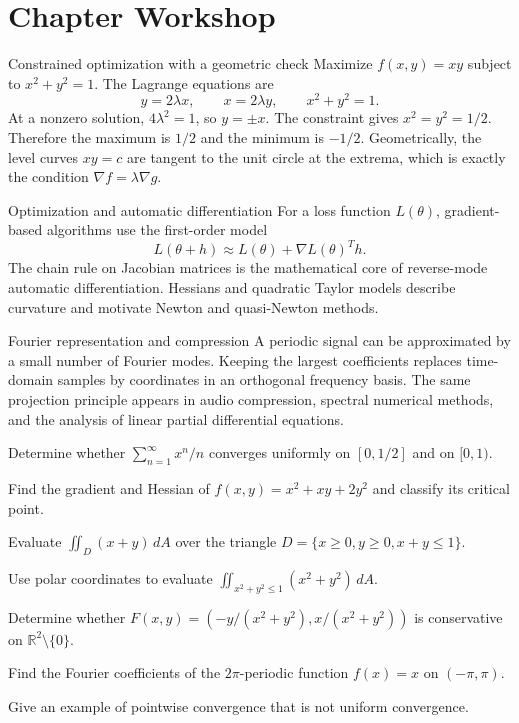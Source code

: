 \section{Chapter Workshop}

\begin{workedexample}{Constrained optimization with a geometric check}
Maximize $f(x,y)=xy$ subject to $x^2+y^2=1$. The Lagrange equations are
\[
    y=2\lambda x,
    \qquad
    x=2\lambda y,
    \qquad
    x^2+y^2=1.
\]
At a nonzero solution, $4\lambda^2=1$, so $y=\pm x$. The constraint gives $x^2=y^2=1/2$. Therefore the maximum is $1/2$ and the minimum is $-1/2$. Geometrically, the level curves $xy=c$ are tangent to the unit circle at the extrema, which is exactly the condition $\nabla f=\lambda\nabla g$.
\end{workedexample}

\begin{applicationbox}{Optimization and automatic differentiation}
For a loss function $L(\theta)$, gradient-based algorithms use the first-order model
\[
    L(\theta+h)\approx L(\theta)+\nabla L(\theta)^Th.
\]
The chain rule on Jacobian matrices is the mathematical core of reverse-mode automatic differentiation. Hessians and quadratic Taylor models describe curvature and motivate Newton and quasi-Newton methods.
\end{applicationbox}

\begin{applicationbox}{Fourier representation and compression}
A periodic signal can be approximated by a small number of Fourier modes. Keeping the largest coefficients replaces time-domain samples by coordinates in an orthogonal frequency basis. The same projection principle appears in audio compression, spectral numerical methods, and the analysis of linear partial differential equations.
\end{applicationbox}

\begin{chapterexercises}
    \item Determine whether $\sum_{n=1}^\infty x^n/n$ converges uniformly on $[0,1/2]$ and on $[0,1)$.
    \item Find the gradient and Hessian of $f(x,y)=x^2+xy+2y^2$ and classify its critical point.
    \item Evaluate $\iint_D(x+y)\,dA$ over the triangle $D=\{x\ge0,y\ge0,x+y\le1\}$.
    \item Use polar coordinates to evaluate $\iint_{x^2+y^2\le1}(x^2+y^2)\,dA$.
    \item Determine whether $F(x,y)=(-y/(x^2+y^2),x/(x^2+y^2))$ is conservative on $\mathbb{R}^2\setminus\{0\}$.
    \item Find the Fourier coefficients of the $2\pi$-periodic function $f(x)=x$ on $(-\pi,\pi)$.
    \item Give an example of pointwise convergence that is not uniform convergence.
\end{chapterexercises}

